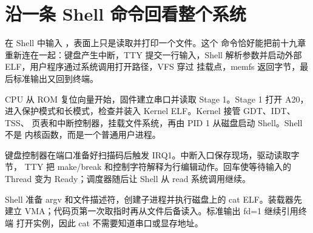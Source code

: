 \section{沿一条 Shell 命令回看整个系统}

在 Shell 中输入 ，表面上只是读取并打印一个文件。这个
命令恰好能把前十九章重新连在一起：键盘产生中断，TTY 提交一行输入，Shell
解析参数并启动外部 ELF，用户程序通过系统调用打开路径，VFS 穿过
 挂载点，memfs 返回字节，最后标准输出又回到终端。

\begin{center}
\end{center}

CPU 从 ROM 复位向量开始，固件建立串口并读取 Stage 1。Stage 1 打开 A20，
进入保护模式和长模式，检查并装入 Kernel ELF。Kernel 接管 GDT、IDT、TSS、
页表和中断控制器，挂载文件系统，再由 PID 1 从磁盘启动 Shell。Shell 不是
内核函数，而是一个普通用户进程。

键盘控制器在端口准备好扫描码后触发 IRQ1。中断入口保存现场，驱动读取字节，
TTY 把 make/break 和控制字符解释为行编辑动作。回车使等待输入的 Thread
变为 Ready；调度器随后让 Shell 从 read 系统调用继续。

Shell 准备 argv 和文件描述符，创建子进程并执行磁盘上的 cat ELF。装载器先
建立 VMA；代码页第一次取指时再从文件后备读入。标准输出 fd=1 继续引用终端
打开实例，因此 cat 不需要知道串口或显存地址。

